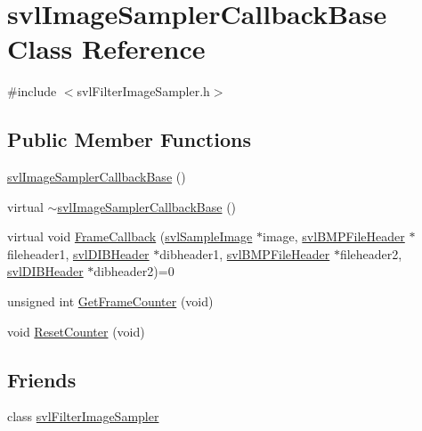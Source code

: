 \hypertarget{classsvl_image_sampler_callback_base}{}\section{svl\+Image\+Sampler\+Callback\+Base Class Reference}
\label{classsvl_image_sampler_callback_base}


{\ttfamily \#include $<$svl\+Filter\+Image\+Sampler.\+h$>$}

\subsection*{Public Member Functions}
\begin{DoxyCompactItemize}
\item 
\hyperlink{classsvl_image_sampler_callback_base_aa7b548ba866bd5549405bc2494202f0b}{svl\+Image\+Sampler\+Callback\+Base} ()
\item 
virtual \hyperlink{classsvl_image_sampler_callback_base_a89e051df92799624d8bad05508088833}{$\sim$svl\+Image\+Sampler\+Callback\+Base} ()
\item 
virtual void \hyperlink{classsvl_image_sampler_callback_base_a178efc582b3ed25af575d3b2268104d1}{Frame\+Callback} (\hyperlink{classsvl_sample_image}{svl\+Sample\+Image} $\ast$image, \hyperlink{structsvl_b_m_p_file_header}{svl\+B\+M\+P\+File\+Header} $\ast$fileheader1, \hyperlink{structsvl_d_i_b_header}{svl\+D\+I\+B\+Header} $\ast$dibheader1, \hyperlink{structsvl_b_m_p_file_header}{svl\+B\+M\+P\+File\+Header} $\ast$fileheader2, \hyperlink{structsvl_d_i_b_header}{svl\+D\+I\+B\+Header} $\ast$dibheader2)=0
\item 
unsigned int \hyperlink{classsvl_image_sampler_callback_base_a4c6993fe52c7496c0038ebad7c579f7c}{Get\+Frame\+Counter} (void)
\item 
void \hyperlink{classsvl_image_sampler_callback_base_a49ab50ab94f65c2b6998855f89714b33}{Reset\+Counter} (void)
\end{DoxyCompactItemize}
\subsection*{Friends}
\begin{DoxyCompactItemize}
\item 
class \hyperlink{classsvl_image_sampler_callback_base_a4f292ca39b01a4b78066fa6da1d081d4}{svl\+Filter\+Image\+Sampler}
\end{DoxyCompactItemize}


